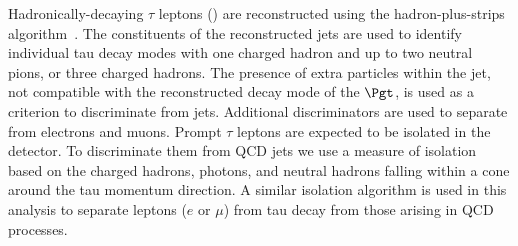 

Hadronically-decaying $\tau$ leptons (\Tau) are reconstructed using the hadron-plus-strips algorithm~\cite{Chatrchyan:2012zz}. The constituents of the reconstructed jets are used to identify individual tau decay modes with one charged hadron and up to two neutral pions, or three charged hadrons. The presence of extra particles within the jet, not compatible with the reconstructed decay mode of the $\Pgt$, is used as a criterion to discriminate \Tau from jets. Additional discriminators are used to separate \Tau from electrons and muons.
Prompt $\tau$ leptons are expected to be isolated in the detector.
To discriminate them from QCD jets we use a measure of isolation 
based on the charged hadrons, photons, and neutral hadrons falling within 
a cone around the tau momentum direction.  A similar isolation algorithm is 
used in this analysis to separate leptons ($e$ or $\mu$) from tau decay from 
those arising in QCD processes.

